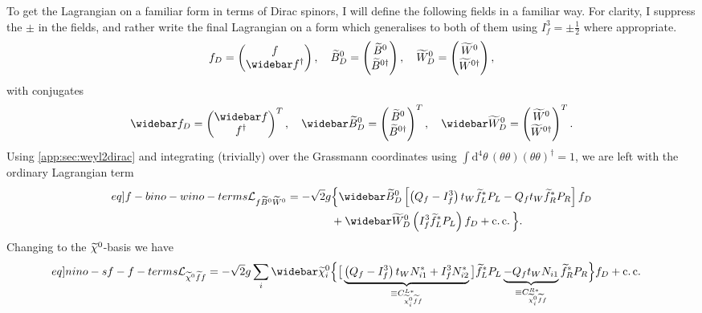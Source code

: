 \documentclass[english, notitlepage]{article}
\begin{document}
To get the Lagrangian on a familiar form in terms of Dirac spinors, I will
define the following fields in a familiar way. For clarity, I suppress the
\(\pm\) in the fields, and rather write the final Lagrangian on a form which
generalises to both of them using \(I^3_f = \pm \frac{1}{2}\) where
appropriate.
\begin{align}
    f_D = \begin{pmatrix}
              f \\ \wbar{f}^\dagger
          \end{pmatrix},
    \quad
    \wtilde{B}^0_D = \begin{pmatrix}
                         \wtilde{B}^0 \\ \wtilde{B}^{0 \dagger}
                     \end{pmatrix},
    \quad
    \wtilde{W}^0_D = \begin{pmatrix}
                         \wtilde{W}^0 \\ \wtilde{W}^{0 \dagger}
                     \end{pmatrix},
\end{align}
with conjugates
\begin{align}
    \wbar{f}_D = \begin{pmatrix}
                     \wbar{f} \\ f^\dagger
                 \end{pmatrix}^T,
    \quad
    \wbar{\wtilde{B}}^0_D = \begin{pmatrix}
                                \wtilde{B}^0 \\ \wtilde{B}^{0 \dagger}
                            \end{pmatrix}^T,
    \quad
    \wbar{\wtilde{W}}^0_D = \begin{pmatrix}
                                \wtilde{W}^0 \\ \wtilde{W}^{0 \dagger}
                            \end{pmatrix}^T.
\end{align}
Using \cref{app:sec:weyl2dirac} and integrating (trivially) over the Grassmann coordinates using \(\int \! \mathrm{d}^4 \theta \,(\theta\theta)(\theta\theta)^\dagger = 1\), we are left with the ordinary Lagrangian term
\begin{align}
    \label[eq]{f-bino-wino-terms}
    \nonumber
    \L_{f\bino\wino} = -\sqrt{2} g & \Big\{ \wbar{\wtilde{B}}^0_D \bclosed{ \pclosed{Q_f - I^3_f} t_W \wtilde{f}_L^\ast P_L - Q_f t_W \wtilde{f}_R^\ast P_R } f_D \\
                                   & + \wbar{\wtilde{W}}^0_D \pclosed{I^3_f \wtilde{f}_L^\ast P_L} f_D + \cc \Big\}.
\end{align}
Changing to the $\nino[]$-basis we have
\begin{align}
    \label[eq]{nino-sf-f-terms}
    \L_{\nino[]\wtilde{f}f} = -\sqrt{2} g \sum_{i} \wbar{\wtilde{\chi}}^0_i & \Big\{ \big[ \underbrace{\pclosed{Q_f - I^3_f}t_W N_{i1}^\ast  + I^3_f N_{i2}^\ast}_{\equiv C_{\nino[i] \wtilde{f} f}^{L\ast}} \big] \wtilde{f}_L^\ast P_L \underbrace{- Q_f t_W N_{i1}}_{\equiv C_{\nino[i] \wtilde{f} f}^{R\ast}} \wtilde{f}_R^\ast P_R \Big\} f_D + \cc
\end{align}
\end{document}
